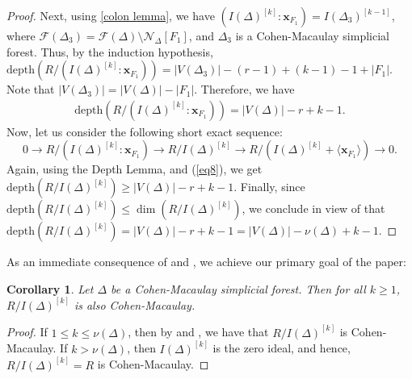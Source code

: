\documentclass[12pt,a4paper,reqno]{amsart}
\newtheorem{corollary}[proposition]{Corollary}
\theoremstyle{definition}
\def\D{\Delta}
\def\F{\mathcal{F}}
\def\N{\mathcal{N}}
\def\d{\mathrm{depth}}
\def\l{\langle}
\def\r{\rangle}
\def\x{\mathbf x}
\begin{document}
\begin{proof}
Next, using \cref{colon lemma}, we have $(I(\Delta)^{[k]}:\x_{F_1})=I(\Delta_3)^{[k-1]}$,
    where $\F(\Delta_3)=\F(\Delta)\setminus \N_{\Delta}[F_1]$, and $\Delta_3$ is a Cohen-Macaulay simplicial forest. Thus, by the induction hypothesis, $\d(R/(I(\Delta)^{[k]}:\x_{F_1}))=|V(\Delta_3)|-(r-1)+(k-1)-1+|F_1|$. Note that $|V(\Delta_3)|=|V(\Delta)|-|F_1|$. Therefore, we have 
    \begin{align}\label{eq8}
     \d(R/(I(\Delta)^{[k]}:\x_{F_1}))=|V(\Delta)|-r+k-1.
    \end{align}
    Now, let us consider the following short exact sequence:
    $$0\rightarrow R/(I(\Delta)^{[k]}:\x_{F_1})\rightarrow R/I(\Delta)^{[k]}\rightarrow R/(I(\Delta)^{[k]}+\l\x_{F_1}\r) \rightarrow 0.$$
    Again, using the Depth Lemma,  and (\ref{eq8}), we get $\d(R/I(\Delta)^{[k]})\ge |V(\Delta)|-r+k-1$. Finally, since $\d(R/I(\Delta)^{[k]})\le \dim(R/I(\Delta)^{[k]})$, we conclude in view of  that $\d(R/I(\Delta)^{[k]})=|V(\Delta)|-r+k-1=|V(\Delta)|-\nu(\D)+k-1$.
\end{proof}

As an immediate consequence of  and , we achieve our primary goal of the paper:

\begin{corollary}\label{main cor}
    Let $\Delta$ be a Cohen-Macaulay simplicial forest. Then for all $k\ge 1$, $R/I(\Delta)^{[k]}$ is also Cohen-Macaulay. 
\end{corollary}
\begin{proof}
    If $1\le k\le \nu(\Delta)$, then by  and , we have that $R/I(\Delta)^{[k]}$ is Cohen-Macaulay. If $k>\nu(\D)$, then $I(\D)^{[k]}$ is the zero ideal, and hence, $R/I(\Delta)^{[k]}=R$ is Cohen-Macaulay. 
\end{proof}
\end{document}
